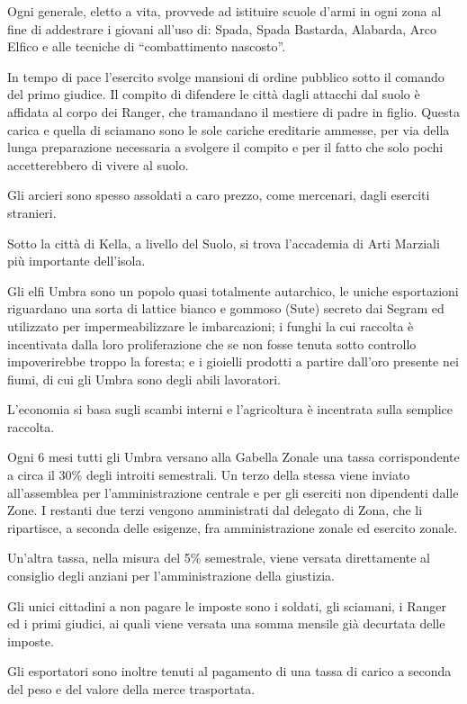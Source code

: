 Ogni generale, eletto a vita, provvede ad istituire scuole d'armi in
ogni zona al fine di addestrare i giovani all'uso di: Spada, Spada
Bastarda, Alabarda, Arco Elfico e alle tecniche di ``combattimento
nascosto''.

In tempo di pace l'esercito svolge mansioni di ordine pubblico sotto
il comando del primo giudice. Il compito di difendere le citt\`a dagli
attacchi dal suolo \`e affidata al corpo dei Ranger, che
tramandano il mestiere di padre in figlio. Questa carica e quella di sciamano
sono le sole cariche ereditarie ammesse, per via della lunga preparazione
necessaria a svolgere il compito e per il fatto che solo pochi
accetterebbero di vivere al suolo.

Gli arcieri sono spesso assoldati a caro prezzo, come mercenari, dagli
eserciti stranieri.

Sotto la citt\`a di Kella, a livello del Suolo, si trova l'accademia
di Arti Marziali pi\`u importante dell'isola.

\Economia Gli elfi Umbra sono un popolo quasi totalmente autarchico,
le uniche esportazioni riguardano una sorta di lattice bianco e
gommoso (Sute) secreto dai Segram ed utilizzato per impermeabilizzare
le imbarcazioni; i funghi la cui raccolta \`e incentivata dalla loro
proliferazione che se non fosse tenuta sotto controllo impoverirebbe
troppo la foresta; e i gioielli prodotti a partire dall'oro presente
nei fiumi, di cui gli Umbra sono degli abili lavoratori.

L'economia si basa sugli scambi interni e l'agricoltura \`e
incentrata sulla semplice raccolta. 

Ogni 6 mesi
tutti gli Umbra versano alla Gabella Zonale una tassa corrispondente a
circa il 30\% degli introiti semestrali. Un terzo della stessa viene
inviato all'assemblea per l'amministrazione centrale e per gli
eserciti non dipendenti dalle Zone. I restanti due terzi vengono
amministrati dal delegato di Zona, che li ripartisce, a seconda delle
esigenze, fra amministrazione zonale ed esercito zonale.

Un'altra tassa, nella misura del 5\% semestrale, viene versata
direttamente al consiglio degli anziani per l'amministrazione della
giustizia.

Gli unici cittadini a non pagare le imposte sono i soldati, gli
sciamani, i Ranger ed i primi giudici, ai quali viene versata una
somma mensile gi\`a decurtata delle imposte. 

Gli esportatori sono inoltre tenuti al pagamento di una tassa di
carico a seconda del peso e del valore della merce trasportata.

